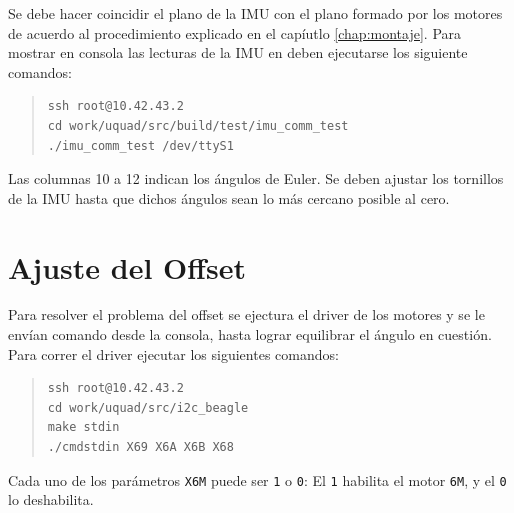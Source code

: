\documentclass[main]{subfiles}
\begin{document}
Se debe hacer coincidir el plano de la IMU con el plano formado por los motores de acuerdo al procedimiento explicado en el cap\'iutlo \ref{chap:montaje}. Para mostrar en consola las lecturas de la IMU en deben ejecutarse los siguiente comandos:
\begin{quote}
\begin{verbatim}
ssh root@10.42.43.2
cd work/uquad/src/build/test/imu_comm_test
./imu_comm_test /dev/ttyS1
\end{verbatim}
\end{quote}

Las columnas 10 a 12 indican los \'angulos de Euler. Se deben ajustar los tornillos de la IMU hasta que dichos \'angulos sean lo m\'as cercano posible al cero.

\section{Ajuste del Offset}

Para resolver el problema del offset se ejectura el driver de los motores y se le env\'ian comando desde la consola, hasta lograr equilibrar el \'angulo en cuesti\'on. Para correr el driver ejecutar los siguientes comandos:

\begin{quote}
\begin{verbatim}
ssh root@10.42.43.2
cd work/uquad/src/i2c_beagle
make stdin
./cmdstdin X69 X6A X6B X68
\end{verbatim}
\end{quote}

Cada uno de los par\'ametros \verb+X6M+ puede ser \verb+1+ o \verb+0+: El \verb+1+ habilita el motor \verb+6M+, y el \verb+0+ lo deshabilita.
\end{document}
